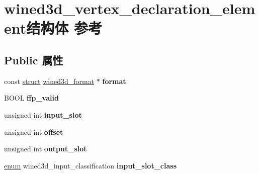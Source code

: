 \hypertarget{structwined3d__vertex__declaration__element}{}\section{wined3d\+\_\+vertex\+\_\+declaration\+\_\+element结构体 参考}
\label{structwined3d__vertex__declaration__element}
\subsection*{Public 属性}
\begin{DoxyCompactItemize}
\item 
\mbox{\label{structwined3d__vertex__declaration__element_ad3f93df6a5e82c5b8c9a63a19be637c7}} 
const \hyperlink{interfacestruct}{struct} \hyperlink{structwined3d__format}{wined3d\+\_\+format} $\ast$ {\bfseries format}
\item 
\mbox{\label{structwined3d__vertex__declaration__element_ae5356eac83d0b7075f07bad0c48a06e0}} 
B\+O\+OL {\bfseries ffp\+\_\+valid}
\item 
\mbox{\label{structwined3d__vertex__declaration__element_aa3f1583ffe1f4fe1ecd8f052cf8b7eb1}} 
unsigned int {\bfseries input\+\_\+slot}
\item 
\mbox{\label{structwined3d__vertex__declaration__element_a8e0005d63fea81898edc52bf44952afc}} 
unsigned int {\bfseries offset}
\item 
\mbox{\label{structwined3d__vertex__declaration__element_a18d07d5056cb47e576b5787e5380b1e1}} 
unsigned int {\bfseries output\+\_\+slot}
\item 
\mbox{\label{structwined3d__vertex__declaration__element_ae049a1b6e0d27327110871392c3fca57}} 
\hyperlink{interfaceenum}{enum} wined3d\+\_\+input\+\_\+classification {\bfseries input\+\_\+slot\+\_\+class}
\item 
\mbox{\label{structwined3d__vertex__declaration__element_ad2aa0b5bf6090298863b50676ac139af}} 

\end{DoxyCompactItemize}
